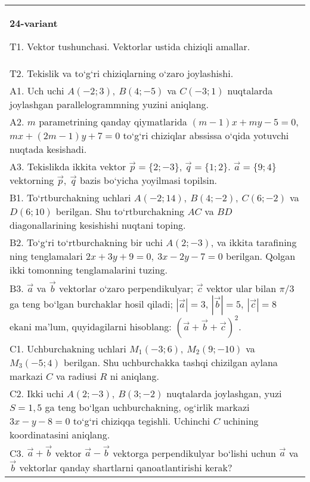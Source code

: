 \documentclass{article}
\begin{document}
\begin{tabular}{m{17cm}}
\textbf{24-variant}
\newline

T1. 
Vektor tushunchasi. Vektorlar ustida chiziqli amallar.
 \\
T2. 
Tekislik va to‘g‘ri chiziqlarning o‘zaro joylashishi.
 \\
A1. 
Uch uchi $A (-2;3), \ B (4;-5) $ va
$C (-3;1)$ nuqtalarda joylashgan parallelogrammning yuzini aniqlang.
 \\
A2. 
$m$ parametrining qanday qiymatlarida
$ (m-1) x+my-5=0$, $mx+ (2m-1) y+7=0$ to‘g‘ri chiziqlar abssissa
o‘qida yotuvchi nuqtada kesishadi.
 \\
A3. 
Tekislikda ikkita vektor
$\overrightarrow{p} = \{ 2; - 3\}$, $\overrightarrow{q} = \{ 1;2\}$.
$\overrightarrow{a} = \{9;4\}$ vektorning
$\overrightarrow{p},\ \overrightarrow{q}$ bazis bo‘yicha yoyilmasi topilsin.
 \\
B1. 
To‘rtburchakning uchlari
\(A (-2;14),\ B (4;-2),\ C (6;-2) \) va \(D (6;10) \) berilgan. Shu
to‘rtburchakning $AC$ va $BD$ diagonallarining kesishishi
nuqtani toping.
 \\
B2. 
To‘g‘ri to‘rtburchakning bir uchi \(A (2;-3) \), va ikkita tarafining
ning tenglamalari \(2x+3y+9=0,\ 3x-2y-7=0\)
berilgan. Qolgan ikki tomonning tenglamalarini tuzing.
 \\
B3. 
$\vec{a}$ va $\vec{b}$ vektorlar o‘zaro perpendikulyar; $\vec{c}$ vektor ular bilan $\pi/3$ ga teng bo‘lgan burchaklar hosil qiladi; $|\vec{a}| = 3$, $|\vec{b}| = 5,\ |\vec{c}| = 8$ ekani ma’lum, quyidagilarni hisoblang:
$ (\vec{a} + \vec{b} + \vec{c}) ^{2}$.
 \\
C1. 
Uchburchakning uchlari \(M_{1} (- 3;6),\ M_{2} (9; - 10) \)
va \(M_{3} (-5;4) \) berilgan. Shu uchburchakka tashqi chizilgan
aylana markazi $C$ va radiusi $R$ ni aniqlang.
 \\
C2. 
Ikki uchi \(A (2; - 3),\ B (3; - 2) \) nuqtalarda
joylashgan, yuzi \(S = 1,5\) ga teng bo‘lgan uchburchakning,
og‘irlik markazi \(3x - y - 8 = 0\) to‘g‘ri chiziqqa tegishli. Uchinchi $C$
uchining koordinatasini aniqlang.
 \\
C3. 
\(\vec{a} + \vec{b}\) vektor \(\vec{a} - \vec{b}\) vektorga perpendikulyar bo‘lishi uchun \(\vec{a}\) va \(\vec{b}\) vektorlar qanday shartlarni qanoatlantirishi kerak?
 \\

\end{tabular}
\vspace{1cm}
\end{document}
